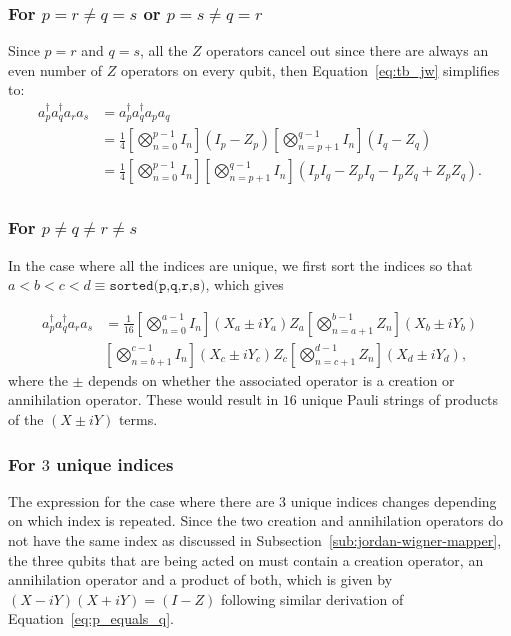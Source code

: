 \subsubsection{For $p=r \neq q=s$ or $p=s \neq q=r$}%
\label{ssub:two_pairs}
Since $p=r$ and $q=s$, all the $ Z $ operators cancel out since there are always an even number of $ Z $ operators on every qubit, then Equation~\eqref{eq:tb_jw} simplifies to:
\begin{equation}
	\label{eq:jw_p_equals_q_r_equals_s}
	\begin{aligned}
		a_{p}^{\dagger}a_{q}^{\dagger}a_ra_s &= a_{p}^{\dagger}a_{q}^{\dagger}a_pa_q \\
		&= \frac{1}{4} \left[ \bigotimes_{n=0}^{p-1} I_n \right] \left( I_p - Z_p \right)  \left[ \bigotimes_{n=p+1}^{q-1} I_n \right] \left( I_q - Z_q \right)\\
		&= \frac{1}{4} \left[ \bigotimes_{n=0}^{p-1} I_n \right]  \left[ \bigotimes_{n=p+1}^{q-1} I_n \right] \left( I_pI_q - Z_pI_q - I_pZ_q + Z_pZ_q \right).\\
	\end{aligned}
\end{equation}

\subsubsection{For $p \neq q \neq r \neq s$ }%
\label{ssub:4_unique}
In the case where all the indices are unique, we first sort the indices so that $ a<b<c<d \equiv \texttt{sorted(p,q,r,s)}$, which gives

\begin{equation}
	\label{eq:jw_4_unique}
	\begin{aligned}
		a_{p}^{\dagger}a_{q}^{\dagger}a_ra_s &= \frac{1}{16} \left[ \bigotimes_{n=0}^{a-1} I_n \right] \left( X_a \pm i Y_a \right)Z_a 
		\left[ \bigotimes_{n=a+1}^{b-1} Z_n \right]  \left( X_b \pm i Y_b \right) \\
		&   \left[ \bigotimes_{n=b+1}^{c-1} I_n \right] \left( X_c \pm i Y_c \right)Z_c  \left[ \bigotimes_{n=c+1}^{d-1} Z_n \right] \left( X_d \pm i Y_d \right),
	\end{aligned}
\end{equation}
where the $ \pm $ depends on whether the associated operator is a creation or annihilation operator. These would result in $ 16 $ unique Pauli strings of products of the $ (X \pm iY) $ terms.

\subsubsection{For $ 3 $ unique indices}%
\label{ssub:3_unique}
The expression for the case where there are $ 3 $ unique indices changes depending on which index is repeated. Since the two creation and annihilation operators do not have the same index as discussed in Subsection~\ref{sub:jordan-wigner-mapper}, the three qubits that are being acted on must contain a creation operator, an annihilation operator and a product of both, which is given by $(X-iY)(X+iY) = (I-Z)$ following similar derivation of Equation~\ref{eq:p_equals_q}.

